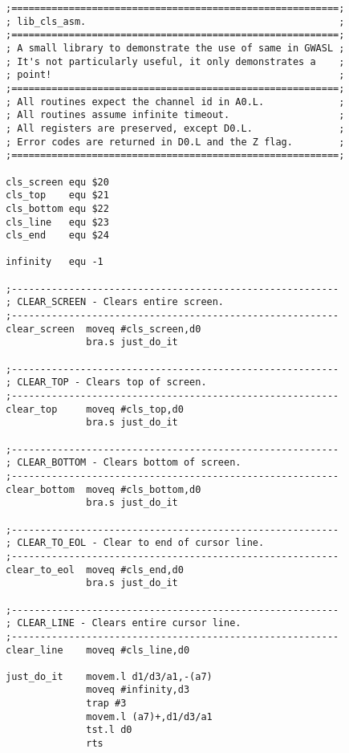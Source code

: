 \begin{lstlisting}[firstnumber=1,caption={Example Library - Lib\_cls\_asm},label={lst:LibClsAsm}]
;=========================================================;
; lib_cls_asm.                                            ;
;=========================================================;
; A small library to demonstrate the use of same in GWASL ;
; It's not particularly useful, it only demonstrates a    ;
; point!                                                  ;
;=========================================================;
; All routines expect the channel id in A0.L.             ;
; All routines assume infinite timeout.                   ;
; All registers are preserved, except D0.L.               ;
; Error codes are returned in D0.L and the Z flag.        ;
;=========================================================;

cls_screen equ $20
cls_top    equ $21
cls_bottom equ $22
cls_line   equ $23
cls_end    equ $24

infinity   equ -1

;---------------------------------------------------------
; CLEAR_SCREEN - Clears entire screen.                    
;---------------------------------------------------------
clear_screen  moveq #cls_screen,d0
              bra.s just_do_it

;---------------------------------------------------------
; CLEAR_TOP - Clears top of screen.                       
;---------------------------------------------------------
clear_top     moveq #cls_top,d0
              bra.s just_do_it

;---------------------------------------------------------
; CLEAR_BOTTOM - Clears bottom of screen.                 
;---------------------------------------------------------
clear_bottom  moveq #cls_bottom,d0
              bra.s just_do_it

;---------------------------------------------------------
; CLEAR_TO_EOL - Clear to end of cursor line.             
;---------------------------------------------------------
clear_to_eol  moveq #cls_end,d0
              bra.s just_do_it

;---------------------------------------------------------
; CLEAR_LINE - Clears entire cursor line.                 
;---------------------------------------------------------
clear_line    moveq #cls_line,d0

just_do_it    movem.l d1/d3/a1,-(a7)
              moveq #infinity,d3
              trap #3
              movem.l (a7)+,d1/d3/a1
              tst.l d0
              rts
\end{lstlisting}

